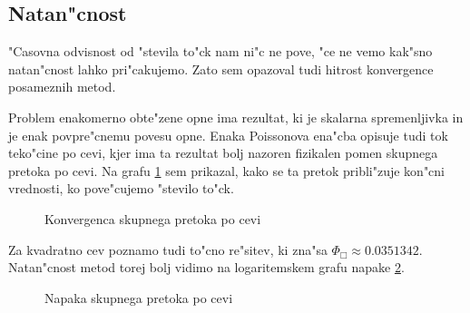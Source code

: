 \documentclass[a4paper,10pt]{article}
\begin{document}
\subsection{Natan"cnost}

"Casovna odvisnost od "stevila to"ck nam ni"c ne pove, "ce ne vemo kak"sno natan"cnost lahko pri"cakujemo. Zato sem opazoval tudi hitrost konvergence posameznih metod. 

Problem enakomerno obte"zene opne ima rezultat, ki je skalarna spremenljivka in je enak povpre"cnemu povesu opne. Enaka Poissonova ena"cba opisuje tudi tok teko"cine po cevi, kjer ima ta rezultat bolj nazoren fizikalen pomen skupnega pretoka po cevi. Na grafu \ref{fig:pretok} sem prikazal, kako se ta pretok pribli"zuje kon"cni vrednosti, ko pove"cujemo "stevilo to"ck. 

\begin{figure}[H]

\caption{Konvergenca skupnega pretoka po cevi}
\label{fig:pretok}  
\end{figure}

Za kvadratno cev poznamo tudi to"cno re"sitev, ki zna"sa $\Phi_\Box \approx 0.0351342$. Natan"cnost metod torej bolj vidimo na logaritemskem grafu napake \ref{fig:pretok-log}. 

\begin{figure}[H]

\caption{Napaka skupnega pretoka po cevi}
\label{fig:pretok-log}  
\end{figure}
\end{document}
